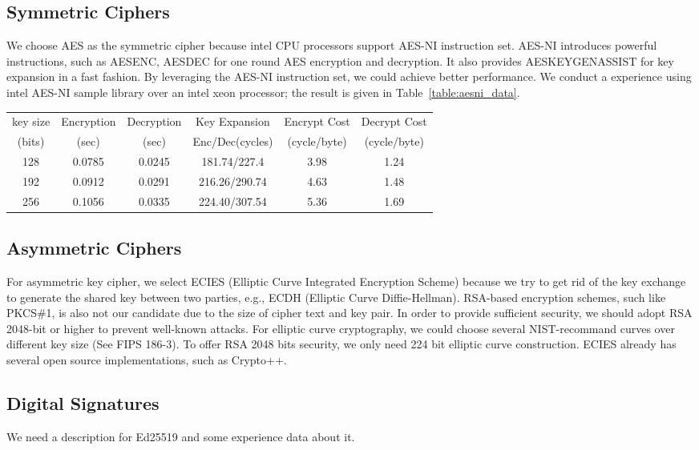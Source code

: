 \subsection{Symmetric Ciphers}
We choose AES as the symmetric cipher because intel CPU processors support
AES-NI instruction set. AES-NI introduces powerful instructions, such as AESENC,
AESDEC for one round AES encryption and decryption. It also provides AESKEYGENASSIST
for key expansion in a fast fashion. By leveraging the AES-NI instruction set, we could
achieve better performance. We conduct a experience using intel AES-NI sample library
over an intel xeon processor; the result is given in Table~\ref{table:aesni_data}.

\begin{table*}[tb]
\centering
\caption{AES performance test over Intel Xeon E5640 Processor. We performed
AES CBC encryption/decryption on a 50MB file over multiple loops, 100 times.}
\label{table:aesni_data}
\begin{tabular}{|c|c|c|c|c|c|} \hline
key size  & Encryption & Decryption& Key Expansion & Encrypt Cost & Decrypt Cost\\ 
(bits)  & (sec) & (sec) & Enc/Dec(cycles) &  (cycle/byte)  & (cycle/byte) \\  \hline
128  &0.0785 & 0.0245 & 181.74/227.4 & 3.98 & 1.24 \\  \hline
192  &0.0912 & 0.0291 & 216.26/290.74 & 4.63 & 1.48 \\  \hline
256  &0.1056 & 0.0335 & 224.40/307.54 & 5.36 & 1.69 \\  \hline
\end{tabular}
\end{table*}

\subsection{Asymmetric Ciphers}
For asymmetric key cipher, we select ECIES (Elliptic Curve Integrated Encryption Scheme)
because we try to get rid of the key exchange to generate the shared key between two parties,
e.g., ECDH (Elliptic Curve Diffie-Hellman). RSA-based encryption schemes, such like PKCS\#1, is
also not our candidate due to the size of cipher text and key pair. In order to provide
sufficient security, we should adopt RSA 2048-bit or higher to prevent well-known attacks.
For elliptic curve cryptography, we could choose several NIST-recommand curves over different
key size (See FIPS 186-3). To offer RSA 2048 bits security, we only need 224 bit elliptic curve
construction. ECIES already has several open source implementations, such as Crypto++.

\subsection{Digital Signatures}
We need a description for Ed25519 and some experience data about it.
